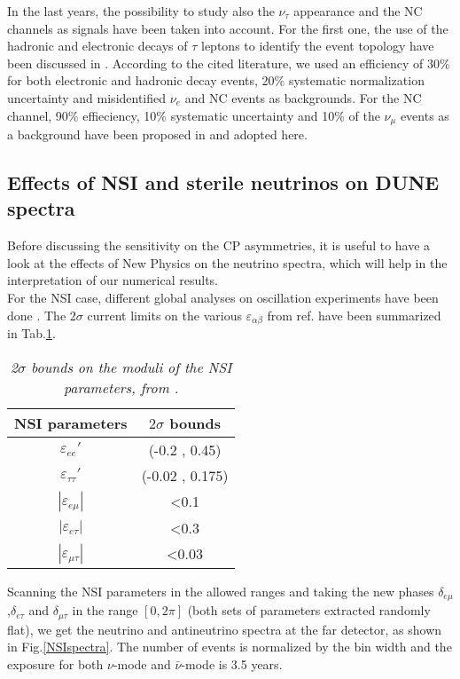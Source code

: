 \documentclass[12pt]{article}
\begin{document}
In the last years, the possibility to study also the $\nu_\tau$ appearance and the NC channels as signals have been taken into account. For the first one, the use of the hadronic and electronic decays of $\tau$ leptons to identify the event topology have been discussed in \cite{deGouvea:2019ozk,Ghoshal:2019pab}. According to the cited literature, we used an efficiency of 30\% for both electronic and hadronic decay events, 20\% systematic normalization uncertainty and misidentified $\nu_e$ and NC events as backgrounds. For the NC channel, 90\% effieciency, 10\% systematic uncertainty and 10\% of the $\nu_\mu$ events as a background have been proposed in \cite{Coloma:2017ptb} and adopted here. 

\subsection{Effects of NSI and sterile neutrinos on DUNE spectra}\label{spectrasect}
Before discussing the sensitivity on the CP asymmetries, it is useful to  have a look at the effects of New Physics on the neutrino spectra, which will help in the interpretation of our numerical results. \\
For the NSI case, different global analyses on oscillation experiments have been done \cite{Esteban:2019lfo,Huitu:2016bmb,Dev:2019anc}. The 2$\sigma$ current limits on the various $\varepsilon_{\alpha\beta}$ from ref.\cite{Esteban:2019lfo} have been summarized in Tab.\ref{tabNSI}.
\begin{table}[]
\centering
\begin{tabular}{|c|c|}
\hline
\textbf{NSI parameters}   & \textbf{$2\sigma$ bounds} \\ \hline
$\varepsilon_{ee}'$       & (-0.2 , 0.45)            \\ \hline
$\varepsilon_{\tau\tau}'$ & (-0.02 , 0.175)          \\ \hline
$|\varepsilon_{e \mu}|$   & \textless{}0.1           \\ \hline
$|\varepsilon_{e \tau}|$    & \textless{}0.3           \\ \hline
$|\varepsilon_{\mu\tau}|$   & \textless{}0.03          \\ \hline
\end{tabular}
\caption{\label{tabNSI}\it  2$\sigma$ bounds on the moduli of the NSI parameters, from \cite{Esteban:2019lfo}.}
\end{table}
Scanning the NSI parameters in the allowed ranges and taking the new phases $\delta_{e\mu}$,$\delta_{e\tau}$ and $\delta_{\mu\tau}$ in the range $[0,2\pi]$ (both sets of parameters extracted randomly flat), we get the  neutrino and antineutrino spectra at the far detector, as shown in Fig.\ref{NSIspectra}. The number of events is normalized by the bin width and the exposure for both $\nu$-mode and $\bar{\nu}$-mode is 3.5 years.\\
\end{document}
